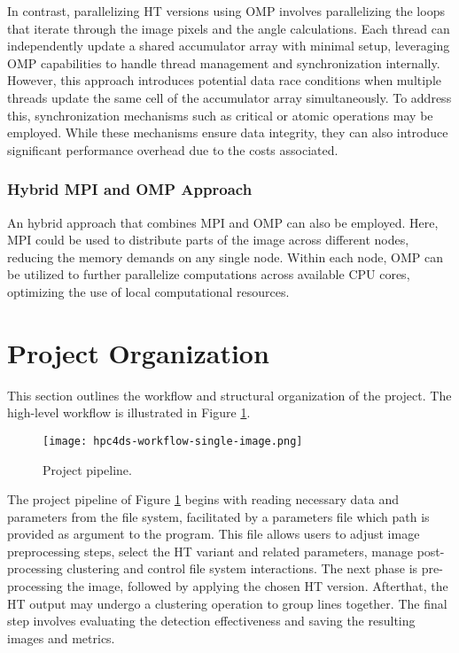 \documentclass[conference]{IEEEtran}
\begin{document}
            In contrast, parallelizing HT versions using OMP involves parallelizing the loops that iterate through the image pixels and the angle calculations. Each thread can independently update a shared accumulator array with minimal setup, leveraging OMP capabilities to handle thread management and synchronization internally. However, this approach introduces potential data race conditions when multiple threads update the same cell of the accumulator array simultaneously. To address this, synchronization mechanisms such as critical or atomic operations may be employed. While these mechanisms ensure data integrity, they can also introduce significant performance overhead due to the costs associated.
    
        \subsubsection{Hybrid MPI and OMP Approach}
        \label{sec:hybrid_mpi_OMP}
        
        An hybrid approach that combines MPI and OMP can also be employed. Here, MPI could be used to distribute parts of the image across different nodes, reducing the memory demands on any single node. Within each node, OMP can be utilized to further parallelize computations across available CPU cores, optimizing the use of local computational resources. 

\section{Project Organization}
\label{sec:prj_org}

    This section outlines the workflow and structural organization of the project. The high-level workflow is illustrated in Figure \ref{fig:pipeline}.
    
    \begin{figure}[htbp]
        \centering
        \texttt{[image: hpc4ds-workflow-single-image.png]}
        \caption{Project pipeline.}
        \label{fig:pipeline}
    \end{figure}
    
    The project pipeline of Figure \ref{fig:pipeline} begins with reading necessary data and parameters from the file system, facilitated by a parameters file which path is provided as argument to the program. This file allows users to adjust image preprocessing steps, select the HT variant and related parameters, manage post-processing clustering and control file system interactions. The next phase is pre-processing the image, followed by applying the chosen HT version. Afterthat, the HT output may undergo a clustering operation to group lines together. The final step involves evaluating the detection effectiveness and saving the resulting images and metrics.
    
\end{document}
